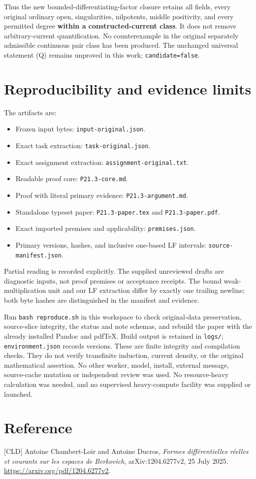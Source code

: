 \documentclass[
  11pt,
]{article}
\providecommand{\tightlist}{%
  \setlength{\itemsep}{0pt}\setlength{\parskip}{0pt}}
\begin{document}
Thus the new bounded-differentiating-factor closure retains all fields,
every original ordinary open, singularities, nilpotents, middle
positivity, and every permitted degree \textbf{within a
constructed-current class}. It does not remove arbitrary-current
quantification. No counterexample in the original separately admissible
continuous pair class has been produced. The unchanged universal
statement (Q) remains unproved in this work; \texttt{candidate=false}.

\section{Reproducibility and evidence
limits}\label{reproducibility-and-evidence-limits}

The artifacts are:

\begin{itemize}
\tightlist
\item
  Frozen input bytes: \texttt{input-original.json}.
\item
  Exact task extraction: \texttt{task-original.json}.
\item
  Exact assignment extraction: \texttt{assignment-original.txt}.
\item
  Readable proof core: \texttt{P21.3-core.md}.
\item
  Proof with literal primary evidence: \texttt{P21.3-argument.md}.
\item
  Standalone typeset paper: \texttt{P21.3-paper.tex} and
  \texttt{P21.3-paper.pdf}.
\item
  Exact imported premises and applicability: \texttt{premises.json}.
\item
  Primary versions, hashes, and inclusive one-based LF intervals:
  \texttt{source-manifest.json}.
\end{itemize}

Partial reading is recorded explicitly. The supplied unreviewed drafts
are diagnostic inputs, not proof premises or acceptance receipts. The
bound weak-multiplication unit and our LF extraction differ by exactly
one trailing newline; both byte hashes are distinguished in the manifest
and evidence.

Run \texttt{bash\ reproduce.sh} in this workspace to check original-data
preservation, source-slice integrity, the status and note schemas, and
rebuild the paper with the already installed Pandoc and pdfTeX. Build
output is retained in \texttt{logs/}; \texttt{environment.json} records
versions. These are finite integrity and compilation checks. They do not
verify transfinite induction, current density, or the original
mathematical assertion. No other worker, model, install, external
message, source-cache mutation or independent review was used. No
resource-heavy calculation was needed, and no supervised heavy-compute
facility was supplied or launched.

\section{Reference}\label{reference}

{[}CLD{]} Antoine Chambert-Loir and Antoine Ducros, \emph{Formes
différentielles réelles et courants sur les espaces de Berkovich},
arXiv:1204.6277v2, 25 July 2025.
\url{https://arxiv.org/pdf/1204.6277v2}.
\end{document}
